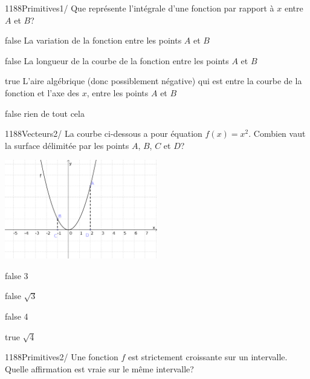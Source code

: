 \documentclass[11pt]{article}
\begin{document}
        	\begin{question}{1188}{Primitives}{1}{/}
				Que représente l'intégrale d'une fonction par rapport à $x$ entre $A$ et $B$?
            \end{question}

            \begin{reponses}
            	\item[false] La variation de la fonction entre les points $A$ et $B$
                \item[false] La longueur de la courbe de la fonction entre les points $A$ et $B$
            	\item[true] L'aire algébrique (donc possiblement négative) qui est entre la courbe de la fonction et l'axe des $x$, entre les points $A$ et $B$
                \item[false] rien de tout cela
            \end{reponses}

            \begin{question}{1188}{Vecteurs}{2}{/}
                La courbe ci-dessous a pour équation $f(x)=x^2$. Combien vaut la surface délimitée par les points $A$, $B$, $C$ et $D$?
                \begin{center}
                	\includegraphics[width=0.5\textwidth]{Philippe/Figures_Philippe/primitives_3_2.png}
                \end{center}
            \end{question}

            \begin{reponses}
                \item[false] 3
                \item[false] $\sqrt{3}$
                \item[false] 4
                \item[true] $\sqrt{4}$ 
            \end{reponses}

            \begin{question}{1188}{Primitives}{2}{/}
                Une fonction $f$ est strictement croissante sur un intervalle. Quelle affirmation est vraie sur le même intervalle?
            \end{question}
\end{document}
